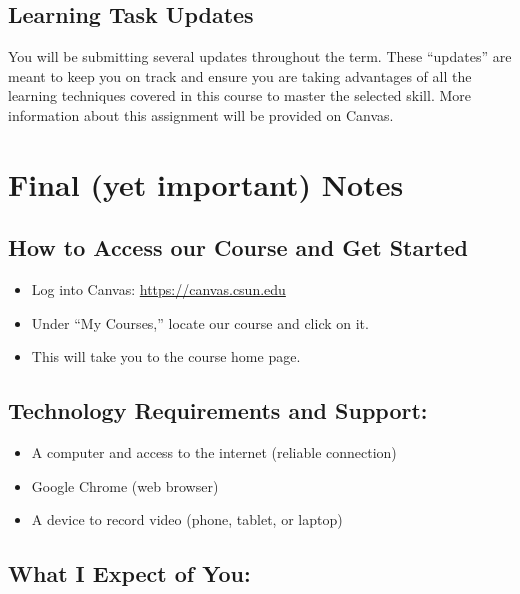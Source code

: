 \documentclass[
  letterpaper,
  DIV=11,
  numbers=noendperiod]{scrartcl}
\providecommand{\tightlist}{%
  \setlength{\itemsep}{0pt}\setlength{\parskip}{0pt}}\usepackage{longtable,booktabs,array}
\begin{document}
\hypertarget{learning-task-updates}{%
\subsection{Learning Task Updates}\label{learning-task-updates}}

You will be submitting several updates throughout the term. These
``updates'' are meant to keep you on track and ensure you are taking
advantages of all the learning techniques covered in this course to
master the selected skill. More information about this assignment will
be provided on Canvas.

\hypertarget{sec-important-notes}{%
\section{Final (yet important) Notes}\label{sec-important-notes}}

\hypertarget{how-to-access-our-course-and-get-started}{%
\subsection{How to Access our Course and Get
Started}\label{how-to-access-our-course-and-get-started}}

\begin{itemize}
\tightlist
\item
  Log into Canvas: \url{https://canvas.csun.edu}
\item
  Under ``My Courses,'' locate our course and click on it.
\item
  This will take you to the course home page.
\end{itemize}

\hypertarget{technology-requirements-and-support}{%
\subsection{Technology Requirements and
Support:}\label{technology-requirements-and-support}}

\begin{itemize}
\tightlist
\item
  A computer and access to the internet (reliable connection)
\item
  Google Chrome (web browser)
\item
  A device to record video (phone, tablet, or laptop)
\end{itemize}

\hypertarget{what-i-expect-of-you}{%
\subsection{What I Expect of You:}\label{what-i-expect-of-you}}
\end{document}
